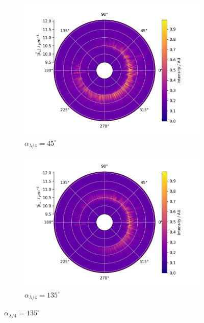 \documentclass[titlepage]{article}
\begin{document}
	\begin{figure}[h!]
		\label{fig:measure_polar}
		\centering
		\begin{subfigure}[b]{0.5\textwidth}
			\centering
			\includegraphics[width=\textwidth]{figures/spin_hall/polar/polar_45.png}
			\caption{$\alpha_{\lambda/4} = 45^\circ$}
			\label{fig:measure_polar_45}
		\end{subfigure}
		\hfill
		\begin{subfigure}[b]{0.49\textwidth}
			\centering
			\includegraphics[width=\textwidth]{figures/spin_hall/polar/polar_135.png}
			\caption{$\alpha_{\lambda/4} = 135^\circ$}
			\label{fig:measure_polar_135}
		\end{subfigure}
		

\end{figure}
\end{document}

